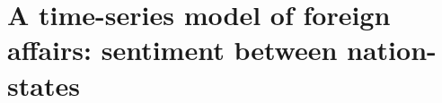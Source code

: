 \chapter{A time-series model of foreign affairs: sentiment between nation-states}

\label{chapter:foreign_relations}










